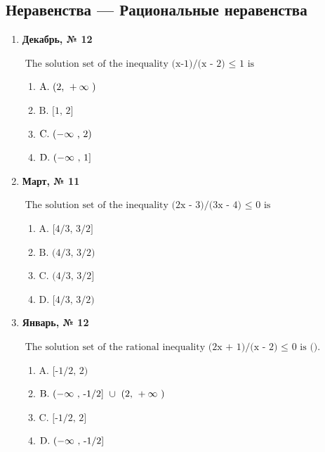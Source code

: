 \subsection*{Неравенства — Рациональные неравенства}
\begin{enumerate}
\item \textbf{Декабрь, № 12} \par \smallskip
$\displaystyle \text{The solution set of the inequality (x-1)/(x - 2) }\leq\text{  1  is}$
\begin{enumerate}
\item $\displaystyle \text{A. (2, }+\infty\text{ )}$
\item $\displaystyle \text{B. [1, 2]}$
\item $\displaystyle \text{C. }(-\infty\text{ , 2)}$
\item $\displaystyle \text{D. }(-\infty\text{ , 1]}$
\end{enumerate}
\item \textbf{Март, № 11} \par \smallskip
$\displaystyle \text{The solution set of the inequality (2x - 3)/(3x - 4) }\leq\text{  0 is}$
\begin{enumerate}
\item $\displaystyle \text{A. [4/3, 3/2]}$
\item $\displaystyle \text{B. (4/3, 3/2)}$
\item $\displaystyle \text{C. (4/3, 3/2]}$
\item $\displaystyle \text{D. [4/3, 3/2)}$
\end{enumerate}
\item \textbf{Январь, № 12} \par \smallskip
$\displaystyle \text{The solution set of the rational inequality (2x + 1)/(x - 2) }\leq\text{  0 is ().}$
\begin{enumerate}
\item $\displaystyle \text{A. [-1/2, 2)}$
\item $\displaystyle \text{B. }(-\infty\text{ , -1/2] }\cup\text{  (2, }+\infty\text{ )}$
\item $\displaystyle \text{C. [-1/2, 2]}$
\item $\displaystyle \text{D. }(-\infty\text{ , -1/2]}$
\end{enumerate}
\end{enumerate}

